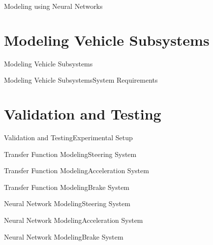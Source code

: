 \documentclass{beamer}
\begin{document}
\begin{frame}{Modeling using Neural Networks}{}

\end{frame}
\section{Modeling Vehicle Subsystems}

\begin{frame}{Modeling Vehicle Subsystems}{}

\end{frame}

\begin{frame}{Modeling Vehicle Subsystems}{System Requirements}

\end{frame}
\section{Validation and Testing}

\begin{frame}{Validation and Testing}{Experimental Setup}

\end{frame}

\begin{frame}{Transfer Function Modeling}{Steering System}

\end{frame}

\begin{frame}{Transfer Function Modeling}{Acceleration System}

\end{frame}

\begin{frame}{Transfer Function Modeling}{Brake System}

\end{frame}

\begin{frame}{Neural Network Modeling}{Steering System}

\end{frame}

\begin{frame}{Neural Network Modeling}{Acceleration System}

\end{frame}

\begin{frame}{Neural Network Modeling}{Brake System}

\end{frame}
\end{document}

